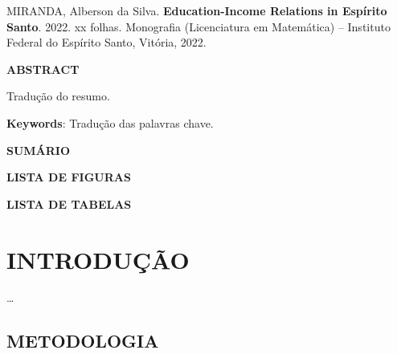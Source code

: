 \documentclass[
  12pt,
  letterpaper,
  DIV=11,
  numbers=noendperiod]{scrartcl}
\newcommand{\nome}{Alberson da Silva}
\newcommand{\sobrenome}{Miranda}
\newcommand{\tituloingles}{Education-Income Relations in Espírito Santo}
\newcommand{\universidade}{Instituto Federal do Espírito Santo}
\newcommand{\curso}{Licenciatura em Matemática}
\newcommand{\cidade}{Vitória}
\newcommand{\ano}{2022}
\begin{document}
\newpage
\thispagestyle{empty}

\begin{singlespace}
\noindent \MakeUppercase{\sobrenome}, \nome. \textbf{\tituloingles}. \ano. xx folhas. Monografia (\curso) -- \universidade, \cidade, \ano.

\vspace{1pc}
\begin{center}
\textbf{ABSTRACT}
\end{center}
\vspace{1pc}

\noindent 
Tradução do resumo.

\vspace{2pc}
\noindent
{\textbf{Keywords}:}  Tradução das palavras chave.
\end{singlespace}

\newpage
\thispagestyle{empty}
\begin{flushleft}
\begingroup
\let\clearpage\relax

\newpage
\begin{center}
\MakeUppercase{\textbf{Sumário}}
\end{center}
\begin{center}
\tableofcontents
\end{center}
\end{flushleft}

\newpage
\thispagestyle{empty}
\begin{center}
\MakeUppercase{\textbf{LISTA DE FIGURAS}}
\end{center}
\begin{center}
\listoffigures
\end{center}

\newpage
\begin{center}
\MakeUppercase{\textbf{LISTA DE TABELAS}}
\end{center}
\begin{center}
\listoftables
\end{center}
\thispagestyle{empty}
\endgroup

\newpage

\hypertarget{introduuxe7uxe3o}{%
\section*{INTRODUÇÃO}\label{introduuxe7uxe3o}}

\ldots{}

\hypertarget{metodologia}{%
\subsection{METODOLOGIA}\label{metodologia}}
\end{document}
